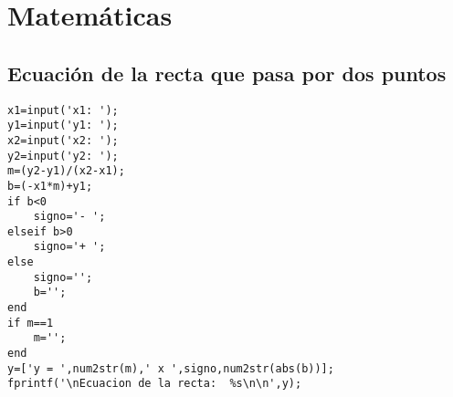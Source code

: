 \chapter{Matemáticas}

\section{Ecuación de la recta que pasa por dos puntos}


\begin{verbatim}
x1=input('x1: ');
y1=input('y1: ');
x2=input('x2: ');
y2=input('y2: ');
m=(y2-y1)/(x2-x1);
b=(-x1*m)+y1;
if b<0
    signo='- ';
elseif b>0 
    signo='+ ';
else
    signo='';
    b='';
end 
if m==1
    m='';
end
y=['y = ',num2str(m),' x ',signo,num2str(abs(b))];
fprintf('\nEcuacion de la recta:  %s\n\n',y);
\end{verbatim}
